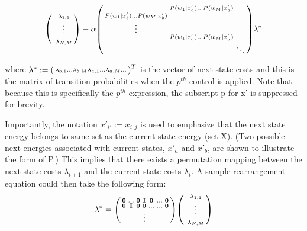 \documentclass[conference]{IEEEtran}
\begin{document}
\begin{gather}\label{eq:mtxLPineq}
\begin{psmallmatrix}
& \lambda_{1,1}\\
& \vdots\\
& \\
& \lambda_{N,M}
\end{psmallmatrix}
-
\alpha
\begin{psmallmatrix}
& P(w_{1}|x'_{a}) \hdots  P(w_{M}|x'_{a})  \\
P(w_{1}|x'_{b}) \hdots  P(w_{M}|x'_{b}) \\
\vdots\\
& P(w_{1}|x'_{a}) \hdots  P(w_{M}|x'_{a})  \\
& & \ddots
\end{psmallmatrix}
\lambda^{*}\end{gather}


where $\lambda^{*} := \begin{psmallmatrix}
\lambda_{b,1} \hdots \lambda_{b,M} \lambda_{a,1}\hdots \lambda_{a,M} \hdots \end{psmallmatrix}^{T}$ is the vector of next state costs and this is the matrix of transition probabilities when the $p^{th}$ control is applied. Note that because this is specifically the $p^{th}$ expression, the subscript p for x' is suppressed for brevity.

Importantly, the notation $x'_{i'}:=x_{i,j}$ is used to emphasize that the next state energy belongs to same set as the current state energy (set X). (Two possible next energies associated with current states, $x'_{a}$ and $x'_{b}$, are shown to illustrate the form of P.) This implies that there exists a permutation mapping between the next state costs $\lambda_{t+1}$ and the current state costs $\lambda_{t}$. A sample rearrangement equation could then take the following form:
\begin{gather} \label{eq:permMtx}
\lambda^{*}
=
\begin{psmallmatrix}
    \bold{0} & \hdots & \bold{0} & \bold{I} & \bold{0} & \hdots & \bold{0} \\
    \bold{0} & \bold{I} & \bold{0} & \bold{0} & \hdots & \hdots & \bold{0} \\
    & & & \vdots\\
\end{psmallmatrix}
\begin{psmallmatrix}
    & \lambda_{1,1}\\
    & \vdots\\
    & \\
    & \lambda_{N,M}
\end{psmallmatrix}
\end{gather}
\end{document}
